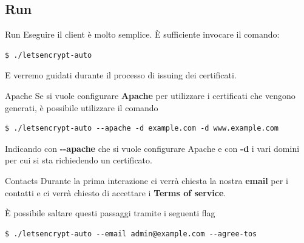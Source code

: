 \documentclass[xcolor=svgnames,11pt]{beamer}
\begin{document}
\subsection{Run}
\begin{frame}[fragile]{Run}
Eseguire il client è molto semplice. È sufficiente invocare il comando:
\begin{block}{}
\begin{scriptsize}
\begin{verbatim}
$ ./letsencrypt-auto
\end{verbatim}
\end{scriptsize}
\end{block}
E verremo guidati durante il processo di issuing dei certificati.
\end{frame}

\begin{frame}[fragile]{Apache}
Se si vuole configurare \textbf{Apache} per utilizzare i certificati che vengono
generati, è possibile utilizzare il comando
\begin{block}{}
\begin{scriptsize}
\begin{verbatim}
$ ./letsencrypt-auto --apache -d example.com -d www.example.com
\end{verbatim}
\end{scriptsize}
\end{block}
Indicando con \textbf{-{}-apache} che si vuole configurare Apache e con \textbf{-d}
i vari domini per cui si sta richiedendo un certificato.
\end{frame}

\begin{frame}[fragile]{Contacts}
Durante la prima interazione ci verrà chiesta la nostra \textbf{email} per i contatti
e ci verrà chiesto di accettare i \textbf{Terms of service}.

\medskip\pause

È possibile saltare questi passaggi tramite i seguenti flag

\medskip

\begin{block}{}
\begin{scriptsize}
\begin{verbatim}
$ ./letsencrypt-auto --email admin@example.com --agree-tos
\end{verbatim}
\end{scriptsize}
\end{block}
\end{frame}
\end{document}
